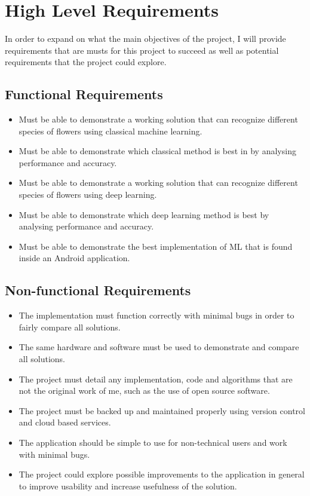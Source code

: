 \documentclass{article}
\begin{document}
\section{High Level Requirements}
In order to expand on what the main objectives of the project, I will provide requirements that are musts for this project to succeed as well as potential requirements that the project could explore.
\subsection{Functional Requirements}
\begin{itemize}
    \item Must be able to demonstrate a working solution that can recognize different species of flowers using classical machine learning.
    \item Must be able to demonstrate which classical method is best in by analysing performance and accuracy.
    \item Must be able to demonstrate a working solution that can recognize different species of flowers using deep learning.
    \item Must be able to demonstrate which deep learning method is best by analysing performance and accuracy.
    \item Must be able to demonstrate the best implementation of ML that is found inside an Android application.
\end{itemize}
\subsection{Non-functional Requirements}
\begin{itemize}
    \item The implementation must function correctly with minimal bugs in order to fairly compare all solutions.
    \item The same hardware and software must be used to demonstrate and compare all solutions.
    \item The project must detail any implementation, code and algorithms that are not the original work of me, such as the use of open source software.
    \item The project must be backed up and maintained properly using version control and cloud based services.
    \item The application should be simple to use for non-technical users and work with minimal bugs.
    \item The project could explore possible improvements to the application in general to improve usability and increase usefulness of the solution.
\end{itemize}
\end{document}
